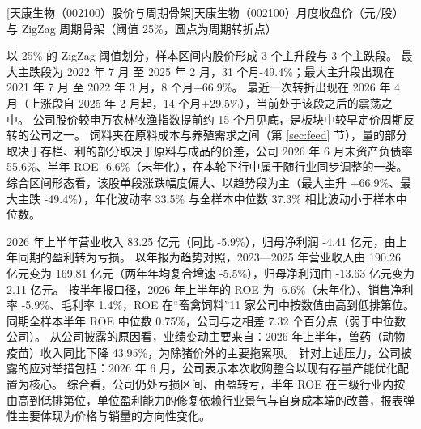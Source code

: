 \begin{center}
\begin{minipage}{\textwidth}\centering
{}

[天康生物（002100）股价与周期骨架]{天康生物（002100）月度收盘价（元/股）与 ZigZag 周期骨架（阈值 25\%，圆点为周期转折点）}
\end{minipage}
\end{center}

 以 25\% 的 ZigZag 阈值划分，样本区间内股价形成 3 个主升段与 3 个主跌段。 最大主跌段为 2022 年 7 月 至 2025 年 2 月，31 个月-49.4\%；最大主升段出现在 2021 年 7 月 至 2022 年 3 月，8 个月+66.9\%。 最近一次转折出现在 2026 年 4 月（上涨段自 2025 年 2 月起，14 个月+29.5\%），当前处于该段之后的震荡之中。 公司股价较申万农林牧渔指数提前约 15 个月见底，是板块中较早定价周期反转的公司之一。 饲料夹在原料成本与养殖需求之间（第 \ref{sec:feed} 节），量的部分取决于存栏、利的部分取决于原料与成品的价差，公司 2026 年 6 月末资产负债率 55.6\%、半年 ROE -6.6\%（未年化），在本轮下行中属于随行业同步调整的一类。 综合区间形态看，该股单段涨跌幅度偏大、以趋势段为主（最大主升 +66.9\%、最大主跌 -49.4\%），年化波动率 33.5\% 与全样本中位数 37.3\% 相比波动小于样本中位数。

 2026 年上半年营业收入 83.25 亿元（同比 -5.9\%），归母净利润 -4.41 亿元，由上年同期的盈利转为亏损。 以年报为趋势对照，2023---2025 年营业收入由 190.26 亿元变为 169.81 亿元（两年年均复合增速 -5.5\%），归母净利润由 -13.63 亿元变为 2.11 亿元。 按半年报口径，2026 年上半年的 ROE 为 -6.6\%（未年化）、销售净利率 -5.9\%、毛利率 1.4\%，ROE 在“畜禽饲料”11 家公司中按数值由高到低排第位。 同期全样本半年 ROE 中位数 0.75\%，公司与之相差 7.32 个百分点（弱于中位数公司）。 从公司披露的原因看，业绩变动主要来自：2026 年上半年，兽药（动物疫苗）收入同比下降 43.95\%，为除猪价外的主要拖累项。 针对上述压力，公司披露的应对举措包括：2026 年 6 月，公司表示本次收购整合以现有存量产能优化配置为核心。 综合看，公司仍处亏损区间、由盈转亏，半年 ROE 在三级行业内按由高到低排第位，单位盈利能力的修复依赖行业景气与自身成本端的改善，报表弹性主要体现为价格与销量的方向性变化。

